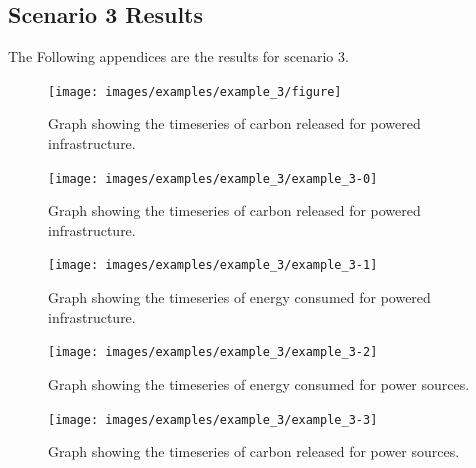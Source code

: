 \documentclass{l4proj}
\begin{document}
\begin{appendices}
\section{Scenario 3 Results}\label{apen:subsec:scen3}
The Following appendices are the results for scenario 3.
\clearpage
\begin{figure}[htbp]
    \centering
    \texttt{[image: images/examples/example\_3/figure]}
    ~
    \caption{Graph showing the timeseries of carbon released for powered infrastructure.}
    \label{fig:example2-0}
\end{figure}
\clearpage
\begin{figure}[htbp]
    \centering
    \texttt{[image: images/examples/example\_3/example\_3-0]}
    ~
    \caption{Graph showing the timeseries of carbon released for powered infrastructure.}
    \label{fig:example3-0}
\end{figure}
\clearpage
\begin{figure}[htbp]
    \centering
    \texttt{[image: images/examples/example\_3/example\_3-1]}
    ~
    \caption{Graph showing the timeseries of energy consumed for powered infrastructure.}
    \label{fig:example3-1}
\end{figure}
\clearpage
\begin{figure}[htbp]
    \centering
    \texttt{[image: images/examples/example\_3/example\_3-2]}
    ~
    \caption{Graph showing the timeseries of energy consumed for power sources.}
    \label{fig:example3-2}
\end{figure}
\clearpage
\begin{figure}[htbp]
    \centering
    \texttt{[image: images/examples/example\_3/example\_3-3]}
    ~
    \caption{Graph showing the timeseries of carbon released for power sources.}
    \label{fig:example3-3}
\end{figure}

\clearpage

\end{appendices}
\end{document}
